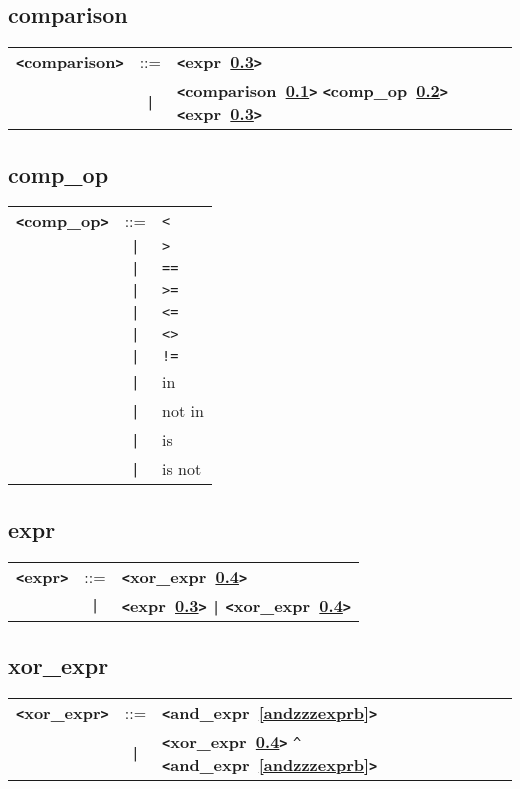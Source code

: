\documentclass[12pt]{article}
\begin{document}
\subsection{comparison}
\label{comparisonb}
\begin{tabular}{lcl}
{\bf \verb+<+comparison\verb+>+} & ::=  & {\bf \verb+<+expr~\ref{exprb}\verb+>+}  \\
 & \verb+|+  & {\bf \verb+<+comparison~\ref{comparisonb}\verb+>+}  {\bf \verb+<+comp\_op~\ref{compzzzopb}\verb+>+}  {\bf \verb+<+expr~\ref{exprb}\verb+>+}  \\
\end{tabular}

\subsection{comp\_op}
\label{compzzzopb}
\begin{tabular}{lcl}
{\bf \verb+<+comp\_op\verb+>+} & ::=  & \verb|<| \\
 & \verb+|+  & \verb|>| \\
 & \verb+|+  & \verb|==| \\
 & \verb+|+  & \verb|>=| \\
 & \verb+|+  & \verb|<=| \\
 & \verb+|+  & \verb|<>| \\
 & \verb+|+  & \verb|!=| \\
 & \verb+|+  & in \\
 & \verb+|+  & not in \\
 & \verb+|+  & is \\
 & \verb+|+  & is not \\
\end{tabular}

\subsection{expr}
\label{exprb}
\begin{tabular}{lcl}
{\bf \verb+<+expr\verb+>+} & ::=  & {\bf \verb+<+xor\_expr~\ref{xorzzzexprb}\verb+>+}  \\
 & \verb+|+  & {\bf \verb+<+expr~\ref{exprb}\verb+>+}  \verb+|+ {\bf \verb+<+xor\_expr~\ref{xorzzzexprb}\verb+>+}  \\
\end{tabular}

\subsection{xor\_expr}
\label{xorzzzexprb}
\begin{tabular}{lcl}
{\bf \verb+<+xor\_expr\verb+>+} & ::=  & {\bf \verb+<+and\_expr~\ref{andzzzexprb}\verb+>+}  \\
 & \verb+|+  & {\bf \verb+<+xor\_expr~\ref{xorzzzexprb}\verb+>+}  \verb|^| {\bf \verb+<+and\_expr~\ref{andzzzexprb}\verb+>+}  \\
\end{tabular}
\end{document}
